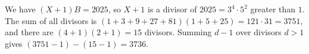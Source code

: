 We have $(X+1)B=2025$, so $X+1$ is a divisor of $2025=3^4\cdot 5^2$ greater than $1$. The sum of all divisors is $(1+3+9+27+81)(1+5+25)=121\cdot 31=3751$, and there are $(4+1)(2+1)=15$ divisors. Summing $d-1$ over divisors $d>1$ gives $(3751-1)-(15-1)=\boxed{3736}$.
